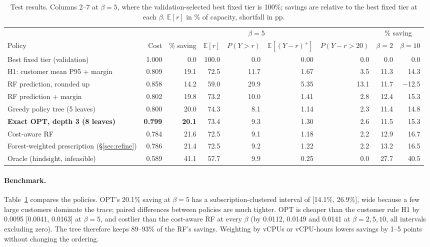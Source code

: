 \documentclass[10pt]{article}
\newcommand{\Ex}{\mathbb{E}}
\begin{document}
\begin{table}[t]
\centering\small
\caption{Test results. Columns 2--7 at $\beta=5$, where the validation-selected best fixed tier is 100\%; savings are relative to the best fixed tier at each $\beta$. $\Ex[r]$ in \% of capacity, shortfall in pp.}
\label{tab:main}
\setlength{\tabcolsep}{4pt}
\begin{tabular}{lrrrrrr|rr}
\toprule
 & \multicolumn{6}{c|}{$\beta=5$} & \multicolumn{2}{c}{\% saving} \\
Policy & Cost & \% saving & $\Ex[r]$ & $P(Y{>}r)$ & $\Ex[(Y{-}r)^+]$ & $P(Y{-}r{>}20)$ & $\beta{=}2$ & $\beta{=}10$ \\
\midrule
Best fixed tier (validation) & 1.000 & 0.0 & 100.0 & 0.0 & 0.00 & 0.0 & 0.0 & 0.0 \\
H1: customer mean P95 + margin & 0.809 & 19.1 & 72.5 & 11.7 & 1.67 & 3.5 & 11.3 & 14.3 \\
RF prediction, rounded up & 0.858 & 14.2 & 59.0 & 29.9 & 5.35 & 13.1 & 11.7 & $-$12.5 \\
RF prediction + margin & 0.802 & 19.8 & 73.2 & 10.0 & 1.41 & 2.8 & 12.4 & 15.3 \\
Greedy policy tree (5 leaves) & 0.800 & 20.0 & 74.3 & 8.1 & 1.14 & 2.3 & 11.4 & 14.8 \\
\textbf{Exact OPT, depth 3 (8 leaves)} & \textbf{0.799} & \textbf{20.1} & 73.4 & 9.3 & 1.30 & 2.6 & 11.5 & 15.3 \\
Cost-aware RF & 0.784 & 21.6 & 72.5 & 9.1 & 1.18 & 2.2 & 12.9 & 16.7 \\
Forest-weighted prescription (\S\ref{sec:refine}) & 0.786 & 21.4 & 72.5 & 9.2 & 1.22 & 2.2 & 13.2 & 16.5 \\
\midrule
Oracle (hindsight, infeasible) & 0.589 & 41.1 & 57.7 & 9.9 & 0.25 & 0.0 & 27.7 & 40.5 \\
\bottomrule
\end{tabular}
\end{table}

\paragraph{Benchmark.} Table~\ref{tab:main} compares the policies. OPT's 20.1\% saving at $\beta=5$ has a subscription-clustered interval of [14.1\%, 26.9\%], wide because a few large customers dominate the trace; paired differences between policies are much tighter. OPT is cheaper than the customer rule H1 by 0.0095 [0.0041, 0.0163] at $\beta=5$, and costlier than the cost-aware RF at every $\beta$ (by 0.0112, 0.0149 and 0.0141 at $\beta=2,5,10$, all intervals excluding zero). The tree therefore keeps 89--93\% of the RF's savings. Weighting by vCPUs or vCPU-hours lowers savings by 1--5 points without changing the ordering.
\end{document}
